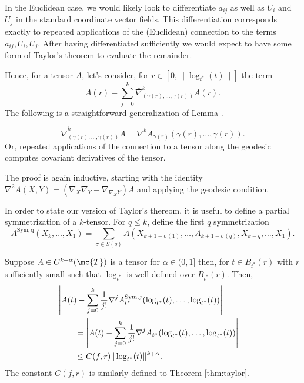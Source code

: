 \documentclass{article}
\begin{document}
In the Euclidean case, we would likely look to differentiate $a_{ij}$ as well as $U_i$ and $U_j$ in the standard coordinate vector fields.
This differentiation corresponds exactly to repeated applications of the (Euclidean) connection to the terms $a_{ij}, U_i, U_j$.
After having
differentiated sufficiently we would expect to have some form of Taylor's theorem to evaluate the remainder.

Hence, for a tensor $A$, let's consider, for $r \in [0, \|\log_{t^*}(t)\|]$ the term
$$
A(r) - \sum_{j=0}^k \bar{\nabla}^k_{(\dot{\gamma}(r), \dots, \dot{\gamma}(r))}A(r).
$$
The following is a straightforward generalization of Lemma \cite{lem:geodesic}.
\begin{lemma}
$$
\bar{\nabla}^k_{(\dot{\gamma}(r), \dots, \dot{\gamma}(r))}A= \nabla^k A_{\gamma(r)}\left(\dot{\gamma}(r), \dots, \dot{\gamma}(r)\right).
$$
Or, repeated applications of the connection to a tensor along the geodesic computes covariant derivatives of the tensor. 
\end{lemma}
The proof is again inductive, starting with the identity $\nabla^2 A(X, Y) = (\nabla_X \nabla_Y - \nabla_{\nabla_XY})A$ and applying the geodesic condition.

In order to state our version of Taylor's thereom, it is useful to define a partial symmetrization of a $k$-tensor. For $q \leq k$, define the first $q$ symmetrization
$$
A^{\mathrm{Sym,q}}(X_k,\dots, X_1) = \sum_{\sigma \in S(q)} A(X_{k+1-\sigma(1)}, \dots, A_{k+1-\sigma(q)}, X_{k-q}, \dots, X_1).
$$

\begin{theorem}
\label{thm:taylor:tensor}
  Suppose $A \in C^{k+\alpha}(\mc{T})$ is a tensor for $\alpha \in (0, 1]$ then, for $t \in B_{t^*}(r)$ with $r$ sufficiently small such that $\log_{t^*}$ is well-defined
    over $B_{t^*}(r)$. Then,
  \begin{equation}
    \label{eq:taylor:theorem}
\begin{aligned}
  \lefteqn{    \left|A(t) - \sum_{j=0}^k \frac{1}{j!} \nabla^j A^{\mathrm{Sym},j}_{t^*}(\log_{t^*}(t), \dots, \log_{t^*}(t)) \right| } \\
  & \qquad =     \left|A(t) - \sum_{j=0}^k \frac{1}{j!} \nabla^j A_{t^*}(\log_{t^*}(t), \dots, \log_{t^*}(t)) \right| \\
  & \qquad \leq C(f,r) \|\log_{t^*}(t)\|^{k+\alpha}.
\end{aligned}
    \end{equation}
The constant $C(f, r)$ is similarly defined to Theorem \ref{thm:taylor}.
  \end{theorem}
\end{document}
